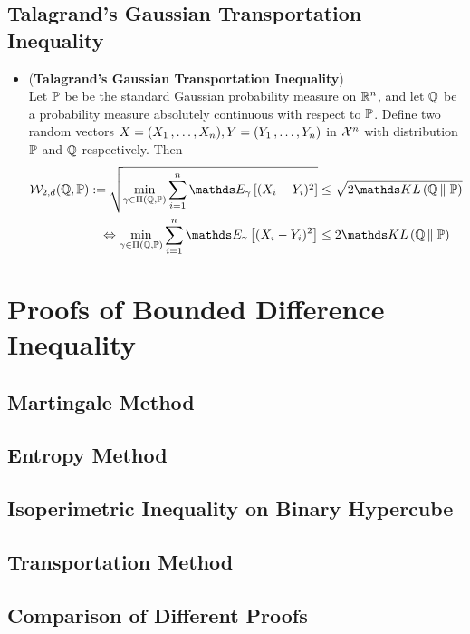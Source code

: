 \documentclass[11pt]{article}
\begin{document}
\subsection{Talagrand's Gaussian Transportation Inequality}
\begin{itemize}
\item \begin{theorem} (\textbf{Talagrand's Gaussian Transportation Inequality}) \citep{boucheron2013concentration}\\
Let ${\mathbb P}$ be be the standard Gaussian probability measure on ${\mathbb R}^n$, and let ${\mathbb Q}$ be a probability measure absolutely continuous with respect to ${\mathbb P}$. Define two random vectors $X = (X_1 \,{,}\ldots{,}\, X_n), Y = (Y_1 \,{,}\ldots{,}\, Y_n)$ in ${\mathcal X}^n$ with distribution ${\mathbb P}$ and ${\mathbb Q}$ respectively.  Then
\begin{align}
\cW_{2, d}(\bQ, \bP) := \sqrt{\min_{\gamma \in \Pi(\bQ, \bP)}\sum_{i=1}^n\E{\gamma}{(X_i - Y_i)^2}   } &\le \sqrt{2\kl{\bQ}{\bP}} \label{ineqn: talagrand_gaussian_transport_cost_inequality} \\
\Leftrightarrow  \min_{\gamma \in \Pi(\bQ, \bP)}\sum_{i=1}^n\E{\gamma}{(X_i - Y_i)^2}   &\le 2\kl{\bQ}{\bP} \nonumber
\end{align}
\end{theorem}
\end{itemize}
\section{Proofs of Bounded Difference Inequality}
\subsection{Martingale Method}
\subsection{Entropy Method}
\subsection{Isoperimetric Inequality on Binary Hypercube}
\subsection{Transportation Method}
\subsection{Comparison of Different Proofs}





\newpage


\end{document}
